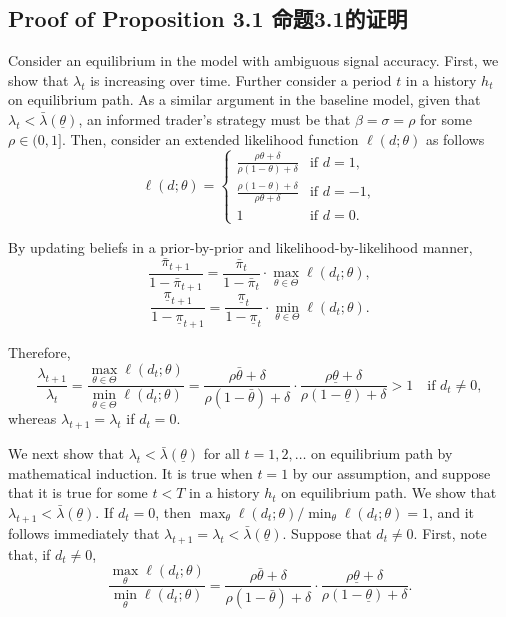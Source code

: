 \documentclass[12pt,a4paper]{article}
\newenvironment{original}{%
  \par\vspace{4pt}\noindent%
  \color{black}%
  \ignorespaces
}{%
  \par\vspace{2pt}%
}
\begin{document}
\subsection*{Proof of Proposition 3.1 \hfill 命题3.1的证明}

\begin{original}
Consider an equilibrium in the model with ambiguous signal accuracy. First, we show that $\lambda_t$ is increasing over time. Further consider a period $t$ in a history $h_t$ on equilibrium path. As a similar argument in the baseline model, given that $\lambda_t < \bar{\lambda}(\underline{\theta})$, an informed trader's strategy must be that $\beta = \sigma = \rho$ for some $\rho \in (0, 1]$. Then, consider an extended likelihood function $\ell(d; \theta)$ as follows
\[
\ell(d; \theta) = \begin{cases}
\frac{\rho\theta + \delta}{\rho(1-\theta) + \delta} & \text{if } d = 1,\\
\frac{\rho(1-\theta) + \delta}{\rho\theta + \delta} & \text{if } d = -1,\\
1 & \text{if } d = 0.
\end{cases}
\]

By updating beliefs in a prior-by-prior and likelihood-by-likelihood manner,
\[
\frac{\bar{\pi}_{t+1}}{1 - \bar{\pi}_{t+1}} = \frac{\bar{\pi}_t}{1 - \bar{\pi}_t} \cdot \max_{\theta\in\Theta} \ell(d_t; \theta),
\]
\[
\frac{\underline{\pi}_{t+1}}{1 - \underline{\pi}_{t+1}} = \frac{\underline{\pi}_t}{1 - \underline{\pi}_t} \cdot \min_{\theta\in\Theta} \ell(d_t; \theta).
\]

Therefore,
\[
\frac{\lambda_{t+1}}{\lambda_t} = \frac{\max_{\theta\in\Theta} \ell(d_t; \theta)}{\min_{\theta\in\Theta} \ell(d_t; \theta)}
= \frac{\rho\bar{\theta} + \delta}{\rho(1-\bar{\theta}) + \delta} \cdot \frac{\rho\underline{\theta} + \delta}{\rho(1-\underline{\theta}) + \delta} > 1 \quad \text{if } d_t \neq 0,
\]
whereas $\lambda_{t+1} = \lambda_t$ if $d_t = 0$.

We next show that $\lambda_t < \bar{\lambda}(\underline{\theta})$ for all $t = 1, 2, \dots$ on equilibrium path by mathematical induction. It is true when $t = 1$ by our assumption, and suppose that it is true for some $t < T$ in a history $h_t$ on equilibrium path. We show that $\lambda_{t+1} < \bar{\lambda}(\underline{\theta})$. If $d_t = 0$, then $\max_{\theta} \ell(d_t; \theta) / \min_{\theta} \ell(d_t; \theta) = 1$, and it follows immediately that $\lambda_{t+1} = \lambda_t < \bar{\lambda}(\underline{\theta})$. Suppose that $d_t \neq 0$. First, note that, if $d_t \neq 0$,
\[
\frac{\max_{\theta} \ell(d_t; \theta)}{\min_{\theta} \ell(d_t; \theta)} = \frac{\rho\bar{\theta} + \delta}{\rho(1-\bar{\theta}) + \delta} \cdot \frac{\rho\underline{\theta} + \delta}{\rho(1-\underline{\theta}) + \delta}.
\]


\end{original}
\end{document}
